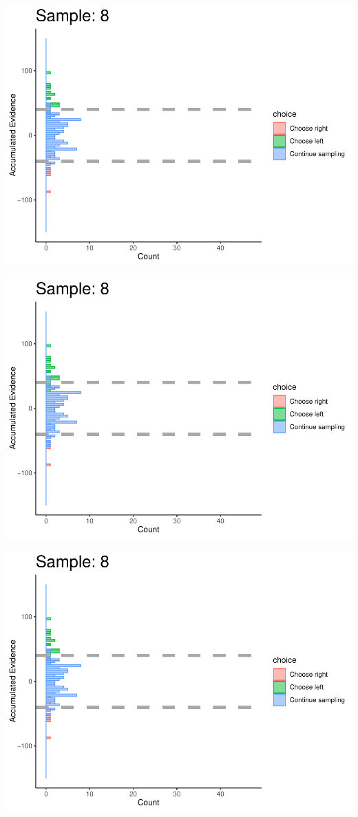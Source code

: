 \documentclass[
]{book}
\begin{document}
\begin{center}\includegraphics[width=0.8\linewidth]{LateNightBayes_files/figure-latex/collapsing_check-71} \end{center}

\begin{center}\includegraphics[width=0.8\linewidth]{LateNightBayes_files/figure-latex/collapsing_check-72} \end{center}

\begin{center}\includegraphics[width=0.8\linewidth]{LateNightBayes_files/figure-latex/collapsing_check-73} \end{center}
\end{document}
